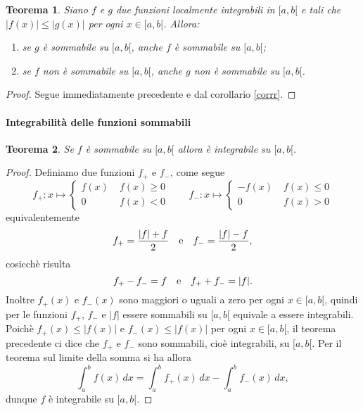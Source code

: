 \documentclass{article}
\theoremstyle{plain}
\newtheorem{thm}{Teorema}[section]
\theoremstyle{definition}
\theoremstyle{remark}
\begin{document}
\vspace{10pt}

\begin{bxthm}
\begin{thm}
    Siano $f$ e $g$ due funzioni localmente integrabili in $[a,b[$ e tali che $|f(x)|\leq|g(x)|$ per ogni $x\in [a,b[$. Allora: 
    \begin{enumerate}
        \item se $g$ è sommabile su $[a,b[$, anche $f$ è sommabile su $[a,b[$;
        \item se $f$ non è sommabile su $[a,b[$, anche $g$ non è sommabile su $[a,b[$.
    \end{enumerate}
\end{thm}
\end{bxthm}
\begin{proof}
    Segue immediatamente precedente e dal corollario \ref{corrr}.
\end{proof}

\vspace{10pt}

\paragraph{Integrabilità delle funzioni sommabili}
\begin{bxthm}
\begin{thm}
    Se $f$ è sommabile su $[a,b[$ allora è integrabile su $[a,b[$.
\end{thm}
\end{bxthm}
\begin{proof}
    Definiamo due funzioni $f_+$ e $f_-$, come segue
    \[ f_+:x\mapsto\begin{cases}
            f(x)&\; f(x)\geq0\\
            0&\; f(x)<0
        \end{cases}\quad\quad
        f_-:x\mapsto\begin{cases}
            -f(x)&\; f(x)\leq0\\
            0&\; f(x)>0
        \end{cases} \]
    equivalentemente \[f_+=\dfrac{|f|+f}{2}\quad\textup{e}\quad f_-=\dfrac{|f|-f}{2},\] cosicchè risulta 
    \[f_+-f_-=f\quad\textup{e}\quad f_++f_-=|f|.\]
    Inoltre $f_+(x)$ e $f_-(x)$ sono maggiori o uguali a zero per ogni $x\in [a,b[$, quindi per le funzioni $f_+$, $f_-$ e $|f|$ essere sommabili su $[a,b[$ equivale a essere integrabili.
    Poichè $f_+(x)\leq|f(x)|$ e $f_-(x)\leq |f(x)|$ per ogni $x\in [a,b[$, il teorema precedente ci dice che $f_+$ e $f_-$ sono sommabili, cioè integrabili, su $[a,b[$. 
    Per il teorema sul limite della somma si ha allora 
    \[\int_{a}^{b}f(x)\,dx=\int_{a}^{b}f_+(x)\,dx-\int_{a}^{b}f_-(x)\,dx,\]
    dunque $f$ è integrabile su $[a,b[$.
\end{proof}
\end{document}
